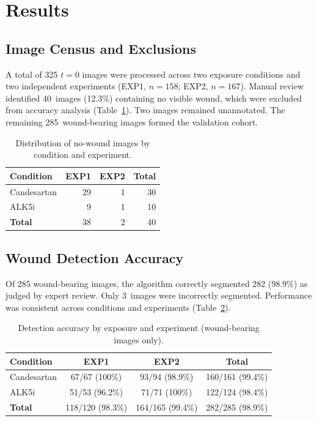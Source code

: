 \section{Results}

\subsection{Image Census and Exclusions}

A total of 325 $t = 0$ images were processed across two exposure conditions and two independent experiments (EXP1, $n = 158$; EXP2, $n = 167$). Manual review identified 40~images (12.3\%) containing no visible wound, which were excluded from accuracy analysis (Table~\ref{tab:nowound}). Two images remained unannotated. The remaining 285~wound-bearing images formed the validation cohort.

\begin{table}[t]
  \centering
  \caption{Distribution of no-wound images by condition and experiment.}\label{tab:nowound}
  \begin{tabular}{lrrr}
    \toprule
    Condition & EXP1 & EXP2 & Total \\
    \midrule
    Candesartan & 29 & 1 & 30 \\
    ALK5i       &  9 & 1 & 10 \\
    \midrule
    \textbf{Total} & 38 & 2 & 40 \\
    \bottomrule
  \end{tabular}
\end{table}

\subsection{Wound Detection Accuracy}

Of 285 wound-bearing images, the algorithm correctly segmented 282 (98.9\%) as judged by expert review. Only 3~images were incorrectly segmented. Performance was consistent across conditions and experiments (Table~\ref{tab:accuracy}).

\begin{table}[t]
  \centering
  \caption{Detection accuracy by exposure and experiment (wound-bearing images only).}\label{tab:accuracy}
  \begin{tabular}{lccc}
    \toprule
    Condition & EXP1 & EXP2 & Total \\
    \midrule
    Candesartan & 67/67 (100\%) & 93/94 (98.9\%) & 160/161 (99.4\%) \\
    ALK5i       & 51/53 (96.2\%) & 71/71 (100\%) & 122/124 (98.4\%) \\
    \midrule
    \textbf{Total} & 118/120 (98.3\%) & 164/165 (99.4\%) & 282/285 (98.9\%) \\
    \bottomrule
  \end{tabular}
\end{table}

